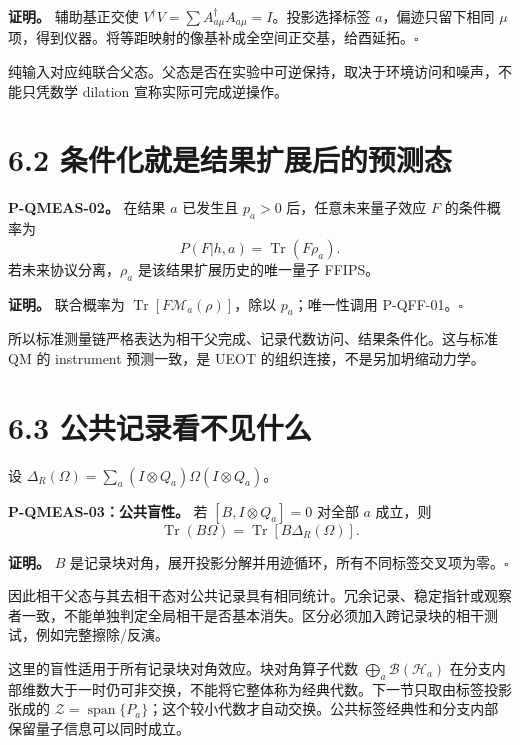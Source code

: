 \documentclass[
  11pt,
  oneside]{book}
\begin{document}
\textbf{证明。} 辅助基正交使
\(V^\dagger V=\sum A_{a\mu}^\dagger A_{a\mu}=I\)。投影选择标签
\(a\)，偏迹只留下相同 \(\mu\)
项，得到仪器。将等距映射的像基补成全空间正交基，给酉延拓。\(\square\)

纯输入对应纯联合父态。父态是否在实验中可逆保持，取决于环境访问和噪声，不能只凭数学
dilation 宣称实际可完成逆操作。

\hypertarget{ux6761ux4ef6ux5316ux5c31ux662fux7ed3ux679cux6269ux5c55ux540eux7684ux9884ux6d4bux6001}{%
\section{6.2
条件化就是结果扩展后的预测态}\label{ux6761ux4ef6ux5316ux5c31ux662fux7ed3ux679cux6269ux5c55ux540eux7684ux9884ux6d4bux6001}}

\protect\hypertarget{p-qmeas-02}{}{}

\textbf{P-QMEAS-02。} 在结果 \(a\) 已发生且 \(p_a>0\)
后，任意未来量子效应 \(F\) 的条件概率为 \[
P(F|h,a)=\operatorname{Tr}(F\rho_a).
\] 若未来协议分离，\(\rho_a\) 是该结果扩展历史的唯一量子 FFIPS。

\textbf{证明。} 联合概率为
\(\operatorname{Tr}[F\mathcal M_a(\rho)]\)，除以 \(p_a\)；唯一性调用
P-QFF-01。\(\square\)

所以标准测量链严格表达为相干父完成、记录代数访问、结果条件化。这与标准
QM 的 instrument 预测一致，是 UEOT 的组织连接，不是另加坍缩动力学。

\hypertarget{ux516cux5171ux8bb0ux5f55ux770bux4e0dux89c1ux4ec0ux4e48}{%
\section{6.3
公共记录看不见什么}\label{ux516cux5171ux8bb0ux5f55ux770bux4e0dux89c1ux4ec0ux4e48}}

设 \(\Delta_R(\Omega)=\sum_a(I\otimes Q_a)\Omega(I\otimes Q_a)\)。

\protect\hypertarget{p-qmeas-03}{}{}

\textbf{P-QMEAS-03：公共盲性。} 若 \([B,I\otimes Q_a]=0\) 对全部 \(a\)
成立，则 \[
\operatorname{Tr}(B\Omega)=\operatorname{Tr}[B\Delta_R(\Omega)].
\]

\textbf{证明。} \(B\)
是记录块对角，展开投影分解并用迹循环，所有不同标签交叉项为零。\(\square\)

因此相干父态与其去相干态对公共记录具有相同统计。冗余记录、稳定指针或观察者一致，不能单独判定全局相干是否基本消失。区分必须加入跨记录块的相干测试，例如完整擦除/反演。

这里的盲性适用于所有记录块对角效应。块对角算子代数
\(\bigoplus_a\mathcal B(\mathcal H_a)\)
在分支内部维数大于一时仍可非交换，不能将它整体称为经典代数。下一节只取由标签投影张成的
\(\mathcal Z=\operatorname{span}\{P_a\}\)；这个较小代数才自动交换。公共标签经典性和分支内部保留量子信息可以同时成立。
\end{document}
